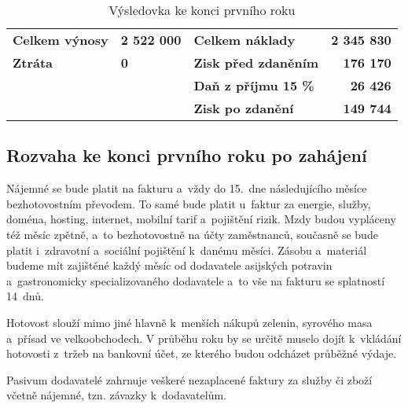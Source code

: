 \begin{table}[htbp]
\begin{center}
\begin{tabular}{lllr}
\textbf{Celkem výnosy} & \textbf{2 522 000}            & \textbf{Celkem náklady}        & \textbf{2 345 830} \\
\textbf{Ztráta}        & \textbf{0}                    & \textbf{Zisk před zdaněním}    & \textbf{176 170}   \\
                       &                               & \textbf{Daň z příjmu 15 \%}    & \textbf{26 426}    \\
                       &                               & \textbf{Zisk po zdanění}       & \textbf{149 744}  
\end{tabular}
\caption{Výsledovka ke konci prvního roku}
\label{vysledovka}
\end{center}
\end{table}

\newpage

\subsection{Rozvaha ke konci prvního roku po zahájení}
Nájemné se bude platit na fakturu a~vždy do 15.~dne následujícího měsíce bezhotovostním převodem. To samé bude platit u~faktur za energie, služby, doména, hosting, internet, mobilní tarif a~pojištění rizik. Mzdy budou vypláceny též měsíc zpětně, a~to bezhotovostně na účty zaměstnanců, současně se bude platit i~zdravotní a~sociální pojištění k~danému měsíci. Zásobu a~materiál budeme mít zajištěné každý měsíc od dodavatele asijských potravin a~gastronomicky specializovaného dodavatele a~to vše na fakturu se splatností 14~dnů. 

Hotovost slouží mimo jiné hlavně k~menších nákupů zelenin, syrového masa a~přísad ve velkoobchodech. V průběhu roku by se určitě muselo dojít k~vkládání hotovosti z~tržeb na bankovní účet, ze kterého budou odcházet průběžné výdaje.

Pasivum dodavatelé zahrnuje veškeré nezaplacené faktury za služby či zboží včetně nájemné, tzn. závazky k~dodavatelům.

